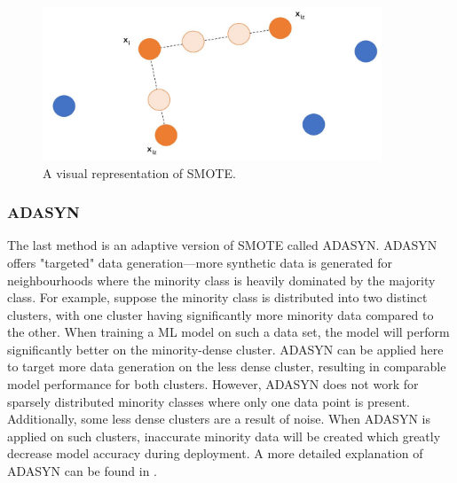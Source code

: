 \begin{figure}[H]
    \centering
    \includegraphics[width=0.9\textwidth]{images/ch3/smote.jpeg}
    \caption{A visual representation of SMOTE.}
    \label{fig:03smote}
\end{figure}

\subsubsection{ADASYN}
The last method is an adaptive version of SMOTE called ADASYN. ADASYN offers "targeted" data generation---more synthetic data is generated for neighbourhoods where the minority class is heavily dominated by the majority class.  For example, suppose the minority class is distributed into two distinct clusters, with one cluster having significantly more minority data compared to the other.  When training a ML model on such a data set, the model will perform significantly better on the minority-dense cluster.  ADASYN can be applied here to target more data generation on the less dense cluster, resulting in comparable model performance for both clusters.  However, ADASYN does not work for sparsely distributed minority classes where only one data point is present.  Additionally, some less dense clusters are a result of noise.  When ADASYN is applied on such clusters, inaccurate minority data will be created which greatly decrease model accuracy during deployment. A more detailed explanation of ADASYN can be found in \cite{adasyn}.



